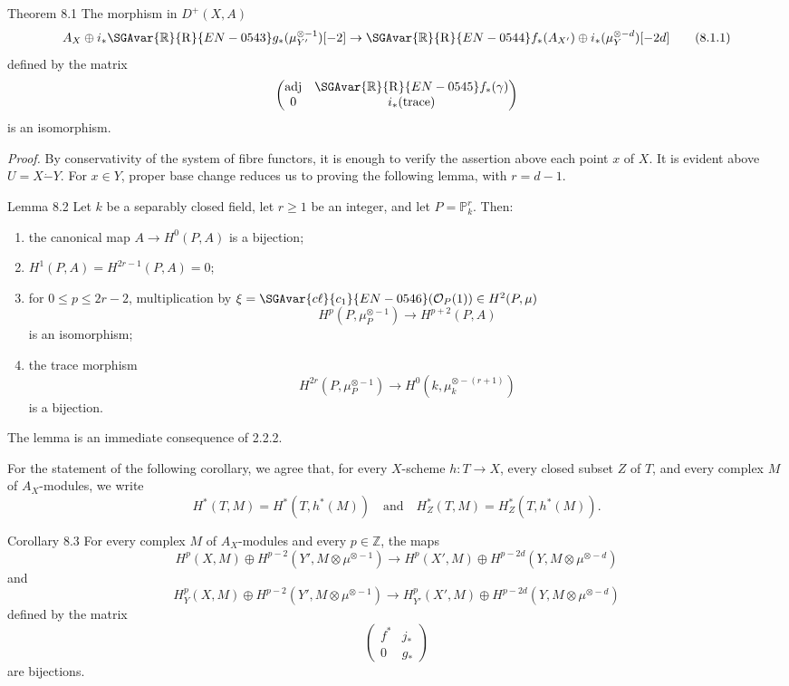 \begin{statement}{Theorem 8.1}
The morphism in $D^+(X,A)$
\[
A_X\oplus i_*\SGAvar{\mathbb{R}}{\mathrm{R}}{EN-0543}g_*(\mu_{Y'}^{\otimes -1})[-2]\to
\SGAvar{\mathbb{R}}{\mathrm{R}}{EN-0544}f_*(A_{X'})\oplus i_*(\mu_Y^{\otimes -d})[-2d]
\tag{8.1.1}
\]
defined by the matrix
\[
\begin{pmatrix}
\operatorname{adj}&\SGAvar{\mathbb{R}}{\mathrm{R}}{EN-0545}f_*(\gamma)\\
0&i_*(\operatorname{trace})
\end{pmatrix}
\]
is an isomorphism.
\end{statement}

\emph{Proof.} By conservativity of the system of fibre functors, it is enough to verify the assertion above each point $x$ of $X$. It is evident above $U=X\mathbin{\dot{-}}Y$. For $x\in Y$, proper base change reduces us to proving the following lemma, with $r=d-1$.

\begin{statement}{Lemma 8.2}
Let $k$ be a separably closed field, let $r\ge1$ be an integer, and let $P=\mathbb P_k^r$. Then:
\begin{enumerate}[label=\alph*)]
\item the canonical map $A\to H^0(P,A)$ is a bijection;
\item $H^1(P,A)=H^{2r-1}(P,A)=0$;
\item for $0\le p\le2r-2$, multiplication by $\xi=\SGAvar{c\ell}{c_1}{EN-0546}(\mathcal O_P(1))\in H^2(P,\mu)$
\[
H^p(P,\mu_P^{\otimes -1})\to H^{p+2}(P,A)
\]
is an isomorphism;
\item the trace morphism
\[
H^{2r}(P,\mu_P^{\otimes -1})\to H^0(k,\mu_k^{\otimes -(r+1)})
\]
is a bijection.
\end{enumerate}
\end{statement}

The lemma is an immediate consequence of 2.2.2.

For the statement of the following corollary, we agree that, for every $X$-scheme $h:T\to X$, every closed subset $Z$ of $T$, and every complex $M$ of $A_X$-modules, we write
\[
H^*(T,M)=H^*(T,h^*(M))
\quad\text{and}\quad
H^*_Z(T,M)=H^*_Z(T,h^*(M)).
\]

\begin{statement}{Corollary 8.3}
For every complex $M$ of $A_X$-modules and every $p\in\mathbb Z$, the maps
\[
H^p(X,M)\oplus H^{p-2}(Y',M\otimes\mu^{\otimes -1})
\to
H^p(X',M)\oplus H^{p-2d}(Y,M\otimes\mu^{\otimes -d})
\tag{8.3.1}
\]
and
\[
H_Y^p(X,M)\oplus H^{p-2}(Y',M\otimes\mu^{\otimes -1})
\to
H_{Y'}^p(X',M)\oplus H^{p-2d}(Y,M\otimes\mu^{\otimes -d})
\tag{8.3.2}
\]
defined by the matrix
\[
\begin{pmatrix}
f^*&j_*\\
0&g_*
\end{pmatrix}
\]
are bijections.
\end{statement}

